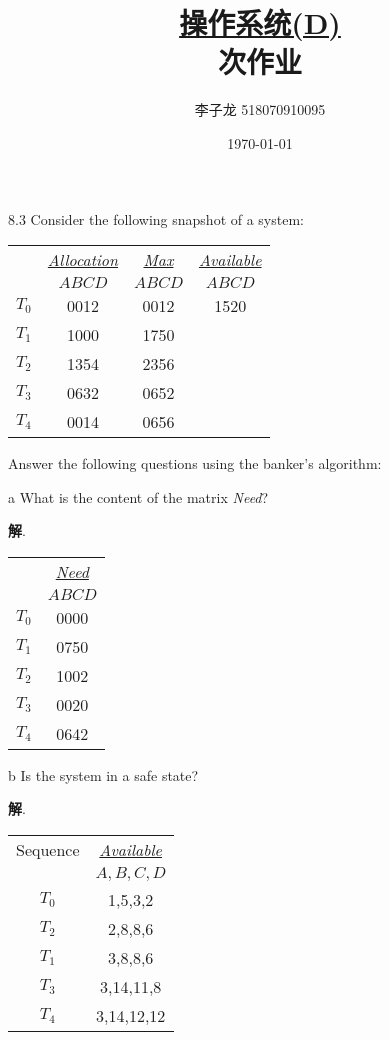 \documentclass[12pt,a4paper]{article}
\newenvironment{problems}{\begin{list}{}{\renewcommand{\makelabel}[1]{\textbf{##1}\hfil}}}{\end{list}}
\newenvironment{steps}{\begin{list}{}{\renewcommand{\makelabel}[1]{##1.\hfil}}}{\end{list}}
\providecommand{\sol}{\textbf{解}.~}
\begin{document}
\title{\normalsize \underline{操作系统(D)}\\ 次作业}
\author{李子龙 518070910095}
\date{\today}
\maketitle

\begin{problems}
    \item[8.3] Consider the following snapshot of a system:
     
    \begin{tabular}{cccc}
         & \underline{\emph{Allocation}} & \underline{\emph{Max}} &  \underline{\emph{Available}}\\
         & $ABCD$ & $ABCD$ & $ABCD$\\
    $T_0$ & 0012 & 0012& 1520\\
    $T_1$ & 1000 & 1750& \\
    $T_2$ & 1354 & 2356& \\
    $T_3$ & 0632 & 0652& \\
    $T_4$ & 0014 & 0656&
    \end{tabular} 

    Answer the following questions using the banker's algorithm:
    \begin{steps}
        \item[a] What is the content of the matrix \emph{Need}?
         
        \sol \begin{tabular}{cc}
            & \underline{\emph{Need}} \\
            & $ABCD$ \\
        $T_0$ & 0000 \\
        $T_1$ & 0750 \\
        $T_2$ & 1002 \\
        $T_3$ & 0020 \\
        $T_4$ & 0642
        \end{tabular} 
        \item[b] Is the system in a safe state?
        
        \sol \begin{tabular}{cc}
          Sequence  & \underline{\emph{Available}} \\
            & $A,B,C,D$ \\
        $T_0$ & 1,5,3,2 \\
        $T_2$ & 2,8,8,6 \\
        $T_1$ & 3,8,8,6 \\
        $T_3$ & 3,14,11,8\\
        $T_4$ & 3,14,12,12
        \end{tabular} 


\end{steps}
\end{problems}
\end{document}
